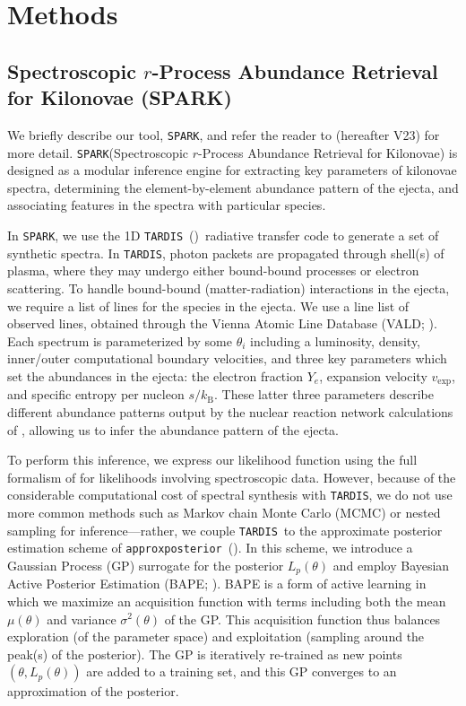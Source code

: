\documentclass[twocolumn,twocolappendix]{aastex63}
\def\SPARK{\texttt{SPARK}}
\def\TARDIS{\texttt{TARDIS}}
\def\approxposterior{\texttt{approxposterior}}
\begin{document}
\section{Methods}\label{sec:methods}

\subsection{Spectroscopic $r$-Process Abundance Retrieval for Kilonovae (\textsc{SPARK})}\label{ssc:spark-summary}

We briefly describe our tool, \SPARK, and refer the reader to \cite{vieira23} (hereafter V23) for more detail. \SPARK (Spectroscopic $r$-Process Abundance Retrieval for Kilonovae) is designed as a modular inference engine for extracting key parameters of kilonovae spectra, determining the element-by-element abundance pattern of the ejecta, and associating features in the spectra with particular species. 

In \SPARK, we use the 1D \TARDIS~(\citealt{kerzendorf14, kerzendorf23})~radiative transfer code to generate a set of synthetic spectra. In \TARDIS, photon packets are propagated through shell(s) of plasma, where they may undergo either bound-bound processes or electron scattering. To handle bound-bound (matter-radiation) interactions in the ejecta, we require a list of lines for the species in the ejecta. We use a line list of observed lines, obtained through the Vienna Atomic Line Database (VALD; \citealt{ryabchikova15, pakhomov19}). Each spectrum is parameterized by some $\theta_i$ including a luminosity, density, inner/outer computational boundary velocities, and three key parameters which set the abundances in the ejecta: the electron fraction $Y_e$, expansion velocity $v_{\mathrm{exp}}$, and specific entropy per nucleon $s / k_{\mathrm{B}}$. These latter three parameters describe different abundance patterns output by the nuclear reaction network calculations of \cite{wanajo18}, allowing us to infer the abundance pattern of the ejecta.  

To perform this inference, we express our likelihood function using the full formalism of \cite{czekala15} for likelihoods involving spectroscopic data. However, because of the considerable computational cost of spectral synthesis with \TARDIS, we do not use more common methods such as Markov chain Monte Carlo (MCMC) or nested sampling for inference---rather, we couple \TARDIS~to the approximate posterior estimation scheme of \approxposterior~(\citealt{fleming18,fleming20}). In this scheme, we introduce a Gaussian Process (GP) surrogate for the posterior $L_p (\theta)$ and employ Bayesian Active Posterior Estimation (BAPE; \citealt{kandasamy17}). BAPE is a form of active learning in which we maximize an acquisition function with terms including both the mean $\mu(\theta)$ and variance $\sigma^2(\theta)$ of the GP. This acquisition function thus balances exploration (of the parameter space) and exploitation (sampling around the peak(s) of the posterior). The GP is iteratively re-trained as new points $(\theta, L_p(\theta))$ are added to a training set, and this GP converges to an approximation of the posterior. 
\end{document}

